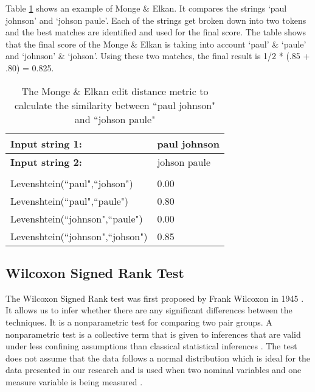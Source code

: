 Table \ref{mongeTable} shows an example of Monge \& Elkan. It compares the strings `paul johnson' and `johson paule'. Each of the strings get broken down into two tokens and the best matches are identified and used for the final score. The table shows that the final score of the Monge \& Elkan is taking into account `paul' \& `paule' and `johnson' \& `johson'. Using these two matches, the final result is 1/2 * (.85 + .80) = 0.825.

\begin{table}[H]
\centering

\begin{tabular}{|l|l|}
\hline
\textbf{Input string 1:}        & paul johnson \\ \hline
\textbf{Input string 2:}        & johson paule \\ \hline
                                &              \\ \hline
Levenshtein(``paul",``johson")    & 0.00         \\ \hline
Levenshtein(``paul",``paule")     & 0.80         \\ \hline
Levenshtein(``johnson",``paule")  & 0.00         \\ \hline
Levenshtein(``johnson",``johson") & 0.85         \\ \hline
\end{tabular}
\caption{The Monge \& Elkan edit distance metric to calculate the similarity between ``paul johnson" and ``johson paule"}
\label{mongeTable}
\end{table}



\subsection{Wilcoxon Signed Rank Test}

The Wilcoxon Signed Rank test was first proposed by Frank Wilcoxon in 1945 \cite{wilcoxon1945individual}. It allows us to infer whether there are any significant differences between the techniques. It is a nonparametric test for comparing two pair groups. A nonparametric test is a collective term that is given to inferences that are valid under less confining assumptions than classical statistical inferences \cite{nonparametric}. The test does not assume that the data follows a normal distribution which is ideal for the data presented in our research and is used when two nominal variables and one measure variable is being measured \cite{mcdonald2009handbook}.

